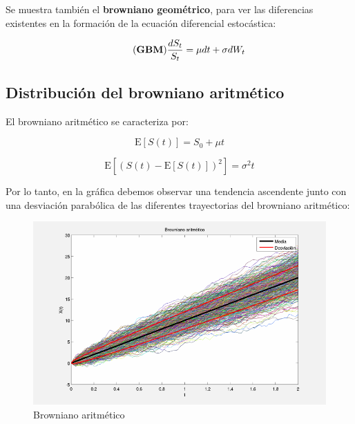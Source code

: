 \documentclass[a4paper,11pt]{article}
\begin{document}
Se muestra tambi\'en el \textbf{browniano geom\'etrico}, para ver las diferencias
existentes en la formaci\'on de la ecuaci\'on diferencial estoc\'astica:

\begin{equation*}
   \tag{\textbf{GBM}}
   \frac{dS_t}{S_t} = \mu dt + \sigma dW_t
\end{equation*}

\subsection{Distribuci\'on del browniano aritm\'etico}

El browniano aritm\'etico se caracteriza por:

\begin{equation*}
   \tag{Media}
   \mathrm{E}[S(t)] = S_0 + \mu t
\end{equation*}

\begin{equation*}
   \tag{Varianza}
   \mathrm{E}[(S(t) - \mathrm{E}[S(t)])^2] = \sigma^2 t
\end{equation*}

Por lo tanto, en la gr\'afica debemos observar una tendencia ascendente junto con
una desviaci\'on parab\'olica de las diferentes trayectorias del browniano
aritm\'etico:\\

\begin{figure}[htb]
   \begin{center}
      \includegraphics[scale=0.5,
      keepaspectratio]{./figures/ABM.png}
   \end{center}
   \caption{Browniano aritm\'etico}
\end{figure}
\end{document}
